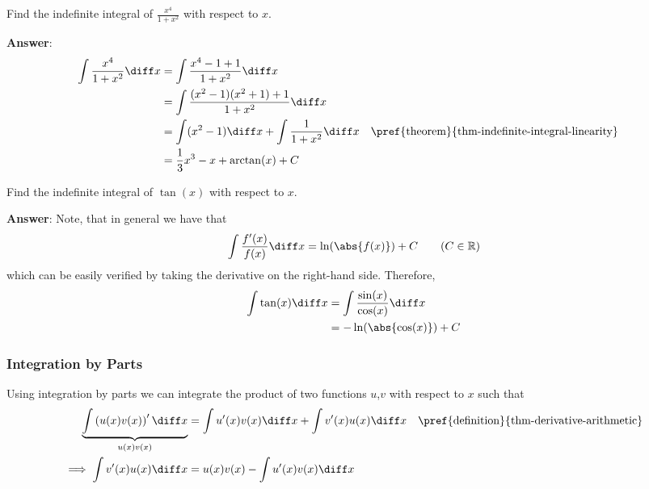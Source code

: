 \begin{exm}\label{exm-indefinite-integral:3}
	Find the indefinite integral of $\tfrac{x^4}{1+x^2}$ with respect to $x$.
	\begin{flushleft}
		\textbf{Answer}:
		\begin{align*}
			\int \frac{x^4}{1+x^2} \diff x & = \int \frac{x^4-1+1}{1+x^2} \diff x                                                                                \\
			                               & = \int \frac{(x^2-1)(x^2+1)+1}{1+x^2} \diff x                                                                       \\
			                               & = \int (x^2-1) \diff x + \int \frac{1}{1+x^2} \diff x &  & \text{\pref{theorem}{thm-indefinite-integral-linearity}} \\
			                               & = \frac{1}{3}x^3 - x + \arctan(x) + C
		\end{align*}
	\end{flushleft}
\end{exm}

\begin{exm}\label{exm-indefinite-integral:4}
	Find the indefinite integral of $\tan(x)$ with respect to $x$.
	\begin{flushleft}
		\textbf{Answer}: Note, that in general we have that
		\begin{equation}\label{eq-useful-integral}
			\int \frac{f'(x)}{f(x)} \diff x = \ln(\abs{f(x)}) + C \qquad(C\in\mathbb{R})
		\end{equation}
		which can be easily verified by taking the derivative on the right-hand side. Therefore,
		\begin{align*}
			\int \tan(x) \diff x & = \int \frac{\sin(x)}{\cos(x)} \diff x \\
			                     & = -\ln(\abs{\cos(x)}) + C
		\end{align*}
	\end{flushleft}
\end{exm}

\subsubsection{Integration by Parts}\label{subsubsec-integration-by-parts}

\begin{definition}\label{def-integration-by-parts}
	Using integration by parts we can integrate the product of two functions
	$u$,$v$ with respect to $x$ such that
	\begin{align*}
		\underbrace{\int \left(u(x)v(x)\right)' \diff x}_{u(x)v(x)} & = \int u'(x)v(x) \diff x + \int v'(x)u(x) \diff x &  & \text{\pref{definition}{thm-derivative-arithmetic}} \\
		\implies \int v'(x)u(x) \diff x                             & = u(x)v(x) - \int u'(x)v(x) \diff x
	\end{align*}
\end{definition}

